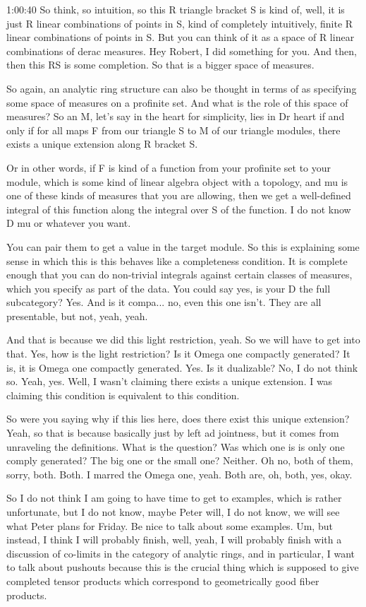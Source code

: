 \begin{unfinished}{1:00:40}
So think, so intuition, so this R triangle bracket S is kind of, well, it is just R linear combinations of points in S, kind of completely intuitively, finite R linear combinations of points in S. But you can think of it as a space of R linear combinations of derac measures. Hey Robert, I did something for you. And then, then this RS is some completion. So that is  a bigger space of measures. 

So again, an analytic ring structure can also be thought in terms of as specifying some space of measures on a profinite set. And what is the role of this space of measures? So an M, let's say in the heart for simplicity, lies in Dr heart if and only if for all maps F from our triangle S to M of our triangle modules, there exists a unique extension along R bracket S. 

Or in other words, if F is kind of a function from your profinite set to your module, which is some kind of linear algebra object with a topology, and mu is one of these kinds of measures that you are allowing, then we get a well-defined integral of this function along the integral over S of the function. I do not know D mu or whatever you want. 

You can pair them to get a value in the target module. So this is explaining some sense in which this is this behaves like a completeness condition. It is  complete enough that you can do non-trivial integrals against certain classes of measures, which you specify as part of the data. You could say yes, is your D the full subcategory? Yes. And is it compa... no, even this one isn't. They are  all presentable, but not, yeah, yeah. 

And that is  because we did this light restriction, yeah. So we will have to get into that. Yes, how is the light restriction? Is it Omega one compactly generated? It is, it is Omega one compactly generated. Yes. Is it dualizable? No, I do not think so. Yeah, yes. Well, I wasn't claiming there exists a unique extension. I was claiming this condition is equivalent to this condition. 

So were you saying why if this lies here, does there exist this unique extension? Yeah, so that is  because basically just by left ad jointness, but it comes from unraveling the definitions. What is the question? Was which one is is only one comply generated? The big one or the small one? Neither. Oh no, both of them, sorry, both. Both. I marred the Omega one, yeah. Both are, oh, both, yes, okay. 

So I do not think I am going to have time to get to examples, which is rather unfortunate, but I do not know, maybe Peter will, I do not know, we will see what Peter plans for Friday. Be nice to talk about some examples. Um, but instead, I think I will probably finish, well, yeah, I will probably finish with a discussion of co-limits in the category of analytic rings, and in particular, I want to talk about pushouts because this is the crucial thing which is supposed to give completed tensor products which correspond to geometrically good fiber products. 


\end{unfinished}
